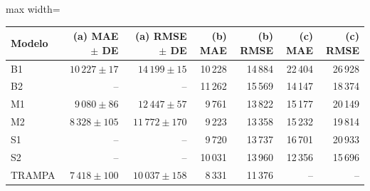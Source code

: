 \begin{center}\small\setlength{\tabcolsep}{4pt}
\begin{adjustbox}{max width=\textwidth}\begin{tabular}{lrrrrrr}
\toprule
Modelo & (a) MAE $\pm$ DE & (a) RMSE $\pm$ DE & (b) MAE & (b) RMSE & (c) MAE & (c) RMSE \\ \midrule
B1 & $10\,227\pm 17$ & $14\,199\pm 15$ & 10\,228 & 14\,884 & 22\,404 & 26\,928 \\
B2 & -- & -- & 11\,262 & 15\,569 & 14\,147 & 18\,374 \\
M1 & $9\,080\pm 86$ & $12\,447\pm 57$ & 9\,761 & 13\,822 & 15\,177 & 20\,149 \\
M2 & $8\,328\pm 105$ & $11\,772\pm 170$ & 9\,223 & 13\,358 & 15\,232 & 19\,814 \\
S1 & -- & -- & 9\,720 & 13\,737 & 16\,701 & 20\,933 \\
S2 & -- & -- & 10\,031 & 13\,960 & 12\,356 & 15\,696 \\
TRAMPA & $7\,418\pm 100$ & $10\,037\pm 158$ & 8\,331 & 11\,376 & -- & -- \\
\bottomrule\end{tabular}\end{adjustbox}\end{center}
